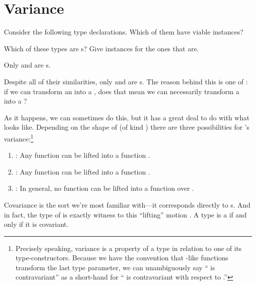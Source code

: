 \documentclass[book.tex]{subfiles}
\begin{document}
\chapter{Variance}

Consider the following type declarations. Which of them have viable 
instances?


\begin{exercise}
Which of these types are s? Give instances for the ones that are.
\end{exercise}
\begin{solution}
  Only  and  are s.

\end{solution}

Despite all of their similarities, only  and  are s.
The reason behind this is one of : if we can transform an 
into a , does that mean we can necessarily transform a  into a
?

As it happens, we can sometimes do this, but it has a great deal to do with what
 looks like. Depending on the shape of  (of kind ) there are three possibilities for 's variance:\footnote{Precisely
speaking, variance is a property of a type in relation to one of its
type-constructors. Because we have the convention that -like functions
transform the last type parameter, we can unambiguously say `` is
contravariant'' as a short-hand for `` is contravariant with respect to
.''}

\begin{enumerate}
  \item{: Any function  can be lifted into
    a function .}
  \item{: Any function  can be
    lifted into a function .}
  \item{: In general, no function  can be
    lifted into a function over .}
\end{enumerate}

Covariance is the sort we're most familiar with---it corresponds directly to
s. And in fact, the type of  is exactly witness to this
``lifting'' motion . A type  is a 
if and only if it is covariant.
\end{document}

